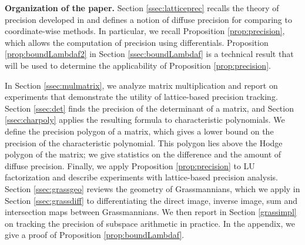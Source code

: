 \documentclass{sig-alternate-2013}
\newcommand{\Q}{\mathbb Q}
\begin{document}
\begin{comment}
The present paper, which may be considered as a continuation of 
\cite{caruso-roe-vaccon:14a}, aims at using the theory of \emph{loc.~cit.} in order to analyze the $p$-adic stability of many standard 
algorithms for computing with basic algebraic structures: numbers, 
matrices, univariate polynomials and vector spaces. For each considered 
algorithm, we will follow the same protocol: 
first, we will compute the theoretical loss of precision of the 
underlying question using the framework of \cite{caruso-roe-vaccon:14a} 
and then compare it to those observed in available implementations in 
\textsc{pari} \cite{pari}, \textsc{magma} \cite{magma} and/or 
\textsc{sage} \cite{sage}.

The conclusion of our analysis is that generic algorithms which are 
designed to work over an arbitrary field are often quite unstable. Very 
roughly, denoting by $D$ the number of divisions performed by the 
algorithm under analysis and by $q$ the cardinality of the residue 
field, it appears that the numbers of lost digits is about $O(\frac D 
q)$ whereas the theoretical loss of precision is closer than $O(\log_q 
D)$ --- and sometimes even $O(1)$. We would like to underline in 
particular that the instability phenomena are much more apparent when 
the residue field is small. It is the reason why we will always take
$K = \Q_2$ is our examples.
\end{comment}

\smallskip

\noindent
{\bf Organization of the paper.}
Section \ref{ssec:latticeprec} recalls the theory of 
precision developed in \cite{caruso-roe-vaccon:14a} and defines
a notion of diffuse precision for comparing to coordinate-wise methods.
In particular, we recall Proposition \ref{prop:precision}, which
allows the computation of precision using differentials.
Proposition \ref{prop:boundLambdaf2} in Section \ref{ssec:boundLambdaf}
is a technical result that will be used to determine the applicability of
Proposition \ref{prop:precision}.

In Section \ref{ssec:mulmatrix}, we analyze matrix multiplication and report
on experiments that demonstrate the utility of lattice-based precision tracking.
Section \ref{ssec:det} finds the precision of the determinant of a
matrix, and Section \ref{ssec:charpoly} applies the resulting formula to
characteristic polynomials.  We define the precision polygon of a matrix, which
gives a lower bound on the precision of the characteristic polynomial.
This polygon lies above the Hodge polygon of the matrix;
we give statistics on the difference and the amount of diffuse precision.
Finally, we apply Proposition \ref{prop:precision} to LU factorization and
describe experiments with lattice-based precision analysis.
Section \ref{ssec:grassgeo} reviews the geometry of Grassmannians,
which we apply in Section \ref{ssec:grassdiff} to differentiating
the direct image, inverse image, sum and intersection maps
between Grassmannians.  We then report in Section \ref{grassimpl}
on tracking the precision of subspace arithmetic in practice.
In the appendix, we give a proof of Proposition \ref{prop:boundLambdaf}.
\end{document}
